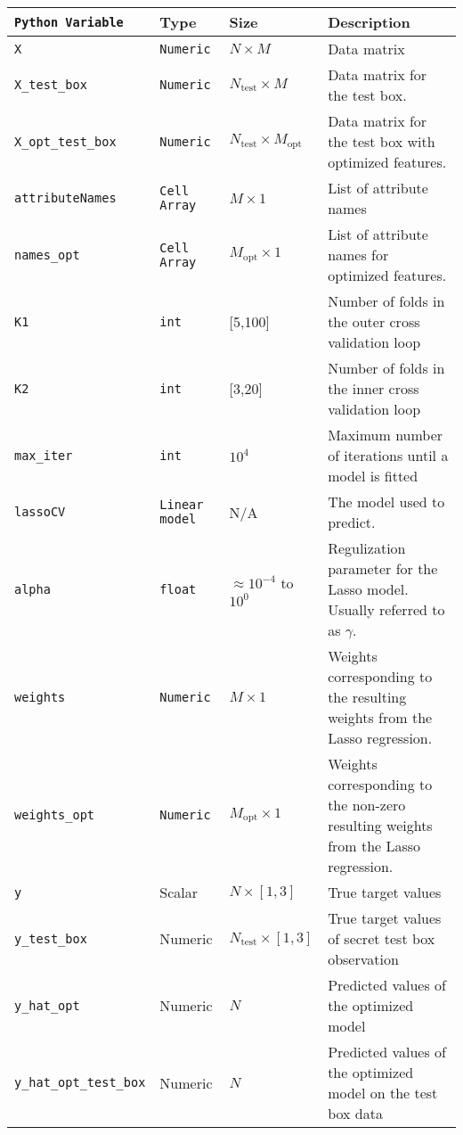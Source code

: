 \begin{center}
\begin{tabular}{p{3.2cm}p{2.3cm}p{1.2cm}p{6cm}}
\texttt{Python Variable} &  Type & Size & Description   \\
\hline\hline
\texttt{X} & \texttt{Numeric} & $N\times M$ & Data matrix \\
\texttt{X\_test\_box} & \texttt{Numeric} & $N_{\text{test}}\times M$ & Data matrix for the test box. \\
\texttt{X\_opt\_test\_box} & \texttt{Numeric} & $N_{\text{test}}\times M_{\text{opt}}$ & Data matrix for the test box with optimized features. \\

\texttt{attributeNames} & \texttt{Cell Array} &$M\times 1$ & List of attribute names \\
\texttt{names\_opt} & \texttt{Cell Array} &$M_{\text{opt}}\times 1$ & List of attribute names for optimized features. \\
\texttt{K1} & \texttt{int} & [5,100] & Number of folds in the outer cross validation loop \\
\texttt{K2} & \texttt{int} & [3,20] & Number of folds in the inner cross validation loop \\
\texttt{max\_iter} & \texttt{int} & $10^{4}$ & Maximum number of iterations until a model is fitted \\
\texttt{lassoCV} & \texttt{Linear model} & N/A & The model used to predict.  \\
\texttt{alpha} & \texttt{float} & $\approx 10^{-4}$ to $10^{0}$ & Regulization parameter for the Lasso model. Usually referred to as $\gamma$. \\
\texttt{weights} & \texttt{Numeric} & $M\times 1$ & Weights corresponding to the resulting weights from the Lasso regression. \\
\texttt{weights\_opt} & \texttt{Numeric} & $M_{\text{opt}}\times 1$ & Weights corresponding to the non-zero resulting weights from the Lasso regression. \\


\midrule
\texttt{y} & Scalar & $N\times [1,3]$ & True target values \\
\texttt{y\_test\_box} & Numeric & $N_{\text{test}}\times [1,3]$ & True target values of secret test box observation\\
\texttt{y\_hat\_opt} & Numeric & $N$ & Predicted values of the optimized model\\ 
\texttt{y\_hat\_opt\_test\_box} & Numeric & $N$ &  Predicted values of the optimized model on the test box data\\ 
\hline
\hline
\end{tabular}
\end{center}